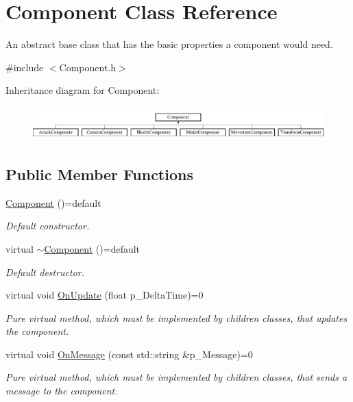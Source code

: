 \hypertarget{class_component}{}\section{Component Class Reference}
\label{class_component}


An abstract base class that has the basic properties a component would need.  




{\ttfamily \#include $<$Component.\+h$>$}

Inheritance diagram for Component\+:\begin{figure}[H]
\begin{center}
\leavevmode
\includegraphics[height=1.323877cm]{class_component}
\end{center}
\end{figure}
\subsection*{Public Member Functions}
\begin{DoxyCompactItemize}
\item 
\mbox{\label{class_component_a404098a91640552f9d0284d08b53def4}} 
\mbox{\hyperlink{class_component_a404098a91640552f9d0284d08b53def4}{Component}} ()=default
\begin{DoxyCompactList}\small\item\em Default constructor. \end{DoxyCompactList}\item 
\mbox{\label{class_component_ad82d7393e339c1b19cc17a0d55b5674d}} 
virtual \mbox{\hyperlink{class_component_ad82d7393e339c1b19cc17a0d55b5674d}{$\sim$\+Component}} ()=default
\begin{DoxyCompactList}\small\item\em Default destructor. \end{DoxyCompactList}\item 
virtual void \mbox{\hyperlink{class_component_ac080e9fa054949464c796b65a4b26b93}{On\+Update}} (float p\+\_\+\+Delta\+Time)=0
\begin{DoxyCompactList}\small\item\em Pure virtual method, which must be implemented by children classes, that updates the component. \end{DoxyCompactList}\item 
virtual void \mbox{\hyperlink{class_component_a1cd106256bf1791f9c6ab347776c7788}{On\+Message}} (const std\+::string \&p\+\_\+\+Message)=0
\begin{DoxyCompactList}\small\item\em Pure virtual method, which must be implemented by children classes, that sends a message to the component. \end{DoxyCompactList}\end{DoxyCompactItemize}


